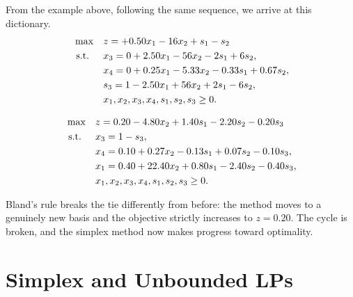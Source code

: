 From the example above, following the same sequence, we arrive at this dictionary.
\[
\begin{aligned}
\max \quad & z = +0.50x_1 - 16x_2 + s_1 - s_2 \\
\text{ s.t. } \quad 
& x_3 = 0 + 2.50x_1 - 56x_2 - 2s_1 + 6s_2, \\
& x_4 = 0 + 0.25x_1 - 5.33x_2 - 0.33s_1 + 0.67s_2, \\
& s_3 = 1 - 2.50x_1 + 56x_2 + 2s_1 - 6s_2, \\
& x_1, x_2, x_3, x_4, s_1, s_2, s_3 \geq 0.
\end{aligned}
\]

\[
\begin{aligned}
\max \quad & z = 0.20 - 4.80x_2 + 1.40s_1 - 2.20s_2 - 0.20s_3 \\
\text{ s.t. } \quad 
& x_3 = 1 - s_3, \\
& x_4 = 0.10 + 0.27x_2 - 0.13s_1 + 0.07s_2 - 0.10s_3, \\
& x_1 = 0.40 + 22.40x_2 + 0.80s_1 - 2.40s_2 - 0.40s_3, \\
& x_1, x_2, x_3, x_4, s_1, s_2, s_3 \geq 0.
\end{aligned}
\]

\noindent Bland's rule breaks the tie differently from before: the method moves to a genuinely new basis and the objective strictly increases to $z=0.20$. The cycle is broken, and the simplex method now makes progress toward optimality.

\section{Simplex and Unbounded LPs}

